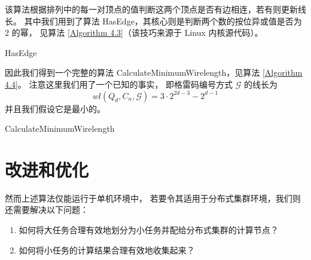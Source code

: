 该算法根据排列中的每一对顶点的值判断这两个顶点是否有边相连，若有则更新线长。
其中我们用到了算法 HasEdge，其核心则是判断两个数的按位异或值是否为 $2$ 的幂，
见算法 \ref{Algorithm 4.3}（该技巧来源于 Linux 内核源代码）。

\begin{algorithm}[h!]
\caption{HasEdge}
\label{Algorithm 4.3}
\begin{algorithmic}[1]
	 
	 

		\State{\Return{\True{}};}
	\Else
		\State{\Return{\False{}};}
	\EndIf
\end{algorithmic}
\end{algorithm}

因此我们得到一个完整的算法 CalculateMinimumWirelength，见算法 \ref{Algorithm 4.4}。
注意这里我们用了一个已知的事实，
即格雷码编号方式 $\mathcal{G}$ 的线长为
\begin{equation*}
wl(Q_d, C_n, \mathcal{G}) = 3 \cdot 2^{2 d - 3} - 2^{d - 1}
\end{equation*}
并且我们假设它是最小的。

\begin{algorithm}[h!]
\caption{CalculateMinimumWirelength}
\label{Algorithm 4.4}
\begin{algorithmic}[1]
	 
	 
	 

	 
\end{algorithmic}
\end{algorithm}

\section{改进和优化}
\label{Section 4.3}

然而上述算法仅能运行于单机环境中，
若要令其适用于分布式集群环境，我们则还需要解决以下问题：
\begin{enumerate}[(1)]
	\item\label{Question 1} 如何将大任务合理有效地划分为小任务并配给分布式集群的计算节点？
	\item\label{Question 2} 如何将小任务的计算结果合理有效地收集起来？
\end{enumerate}

